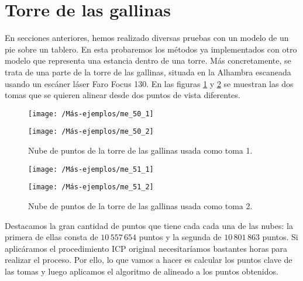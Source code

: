 \section{Torre de las gallinas}
En secciones anteriores, hemos realizado diversas pruebas con un modelo de un pie sobre un tablero. En esta probaremos los métodos ya implementados con otro modelo que representa una estancia dentro de una torre. Más concretamente, se trata de una parte de la torre de las gallinas, situada en la Alhambra escaneada usando un escáner láser Faro Focus 130. En las figuras \ref{toma1} y \ref{toma2} se muestran las dos tomas que se quieren alinear desde dos puntos de vista diferentes. \\

\begin{figure}[h!]
	\begin{minipage}[b]{0.5\textwidth}
		\centering		
		\texttt{[image: /Más-ejemplos/me\_50\_1]} 
	\end{minipage}
	\begin{minipage}[b]{0.5\textwidth}
		\centering
		\texttt{[image: /Más-ejemplos/me\_50\_2]}
	\end{minipage}
	\caption{Nube de puntos de la torre de las gallinas usada como toma 1.}
	\label{toma1}
\end{figure}

\begin{figure}[h!]
	
	\begin{minipage}[b]{0.5\textwidth}
		\centering		
		\texttt{[image: /Más-ejemplos/me\_51\_1]} 
	\end{minipage}
	\begin{minipage}[b]{0.5\textwidth}
		\centering
		\texttt{[image: /Más-ejemplos/me\_51\_2]}
	\end{minipage}
	\caption{Nube de puntos de la torre de las gallinas usada como toma 2.}
	\label{toma2}
\end{figure}

Destacamos la gran cantidad de puntos que tiene cada cada una de las nubes: la primera de ellas consta de $ 10\,557\,654 $ puntos y la segunda de $ 10\,801\,863 $ puntos. Si aplicáramos el procedimiento ICP original necesitaríamos bastantes horas para realizar el proceso. Por ello, lo que vamos a hacer es calcular los puntos clave de las tomas y luego aplicamos el algoritmo de alineado a los puntos obtenidos.\\

